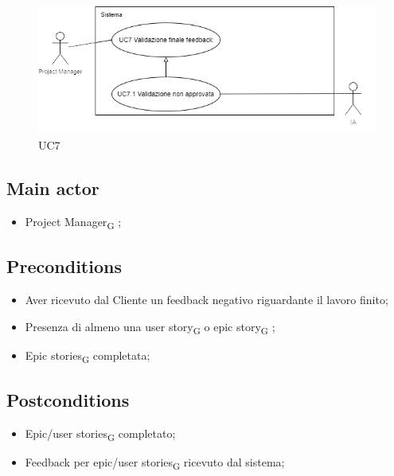 \documentclass{article}
\begin{document}
\begin{figure}[h]
      \centering
      \includegraphics{./imgUML/UC7.png}
        \caption{UC7}
      \label{fig:UC7}
    \end{figure}
    
    \subsection*{Main actor}
    \begin{itemize}
        \item Project Manager\textsubscript{G} ;
    \end{itemize}
    
    \subsection*{Preconditions}
    \begin{itemize}
        \item Aver ricevuto dal Cliente un feedback negativo riguardante il lavoro finito;
        \item Presenza di almeno una user story\textsubscript{G}  o epic story\textsubscript{G} ;
        \item Epic stories\textsubscript{G}  completata;
    \end{itemize}
    
    \subsection*{Postconditions}
    \begin{itemize}
        \item Epic/user stories\textsubscript{G}  completato;
        \item Feedback per epic/user stories\textsubscript{G}  ricevuto dal sistema; 
    \end{itemize}
    
\end{document}
